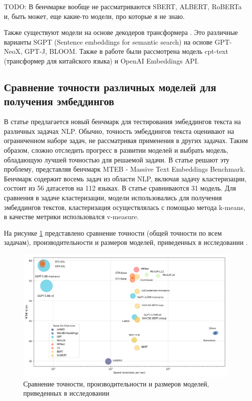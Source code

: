 TODO: В бенчмарке вообще не рассматриваются SBERT, ALBERT, RoBERTa и, быть может, еще какие-то модели, про которые я не знаю.

Также существуют модели на основе декодеров трансформера \cite{mteb}. Это различные варианты SGPT (Sentence embeddings for semantic search) на основе GPT-NeoX, GPT-J, BLOOM. Также в работе были рассмотрена модель cpt-text (трансформер для китайского языка) и OpenAI Embeddings API.

\subsection{Сравнение точности различных моделей для получения эмбеддингов}

В статье \cite{mteb} предлагается новый бенчмарк для тестирования эмбеддингов текста на различных задачах NLP. Обычно, точность эмбеддингов текста оценивают на ограниченном наборе задач, не рассматривая применения в других задачах. Таким образом, сложно отследить прогресс в развитии моделей и выбрать модель, обладающую лучшей  точностью для решаемой задачи. В статье решают эту проблему, представляя бенчмарк MTEB - Massive Text Embeddings Benchmark. Бенчмарк содержит восемь задач из области NLP, включая задачу кластеризации, состоит из 56 датасетов на 112 языках. В статье сравниваются 31 модель. Для сравнения в задаче кластеризации, модели использовались для получения эмбеддингов текстов, кластеризация осуществлялась с помощью метода k-means, в качестве метрики использовался v-measure.


На рисунке \ref{img:mteb_models} представлено сравнение точности (общей точности по всем задачам), производительности и размеров моделей, приведенных в исследовании \cite{mteb}.

\begin{figure}[h]
    \centering
    \includegraphics[width=\linewidth]{images/mteb-models.png}
    \caption{Сравнение точности, производительности и размеров моделей, приведенных в исследовании \cite{mteb}}
    \label{img:mteb_models}
\end{figure}

